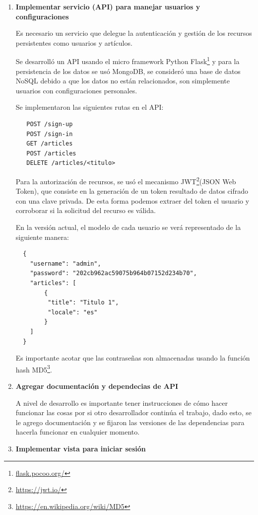 \begin{enumerate}
  \smallbreak
  \item\textbf{Implementar servicio (API) para manejar usuarios y configuraciones}
  \smallbreak
  
  Es necesario un servicio que delegue la autenticación y gestión de los recursos persistentes como usuarios y artículos.
  
  Se desarrolló un API usando el micro framework Python Flask\footnote{\url{flask.pocoo.org/}} y para la persistencia de los datos se usó MongoDB, se consideró una base de datos NoSQL debido a que los datos no están relacionados, son simplemente usuarios con configuraciones personales.
  
  Se implementaron las siguientes rutas en el API:
  \begin{verbatim}
   POST /sign-up
   POST /sign-in
   GET /articles
   POST /articles
   DELETE /articles/<titulo>
  \end{verbatim}
  
  Para la autorización de recursos, se usó el mecanismo JWT\footnote{\url{https://jwt.io/}}(JSON Web Token), que consiste en la generación de un token resultado de datos cifrado con una clave privada. De esta forma podemos extraer del token el usuario y corroborar si la solicitud del recurso es válida.
  
  
  En la versión actual, el modelo de cada usuario se verá representado de la siguiente manera:
  
  \begin{verbatim}
  {
    "username": "admin",
    "password": "202cb962ac59075b964b07152d234b70",
    "articles": [
        {
         "title": "Titulo 1",
         "locale": "es"
        }
    ]
  }
  \end{verbatim}
  
  Es importante acotar que las contraseñas son almacenadas usando la función hash MD5\footnote{\url{https://en.wikipedia.org/wiki/MD5}}.

  \smallbreak
  \item\textbf{Agregar documentación y dependecias de API}
  \smallbreak
  
  A nivel de desarrollo es importante tener instrucciones de cómo hacer funcionar las cosas por si otro desarrollador continúa el trabajo, dado esto, se le agrego documentación y se fijaron las versiones de las dependencias para hacerla funcionar en cualquier momento.
  
  \smallbreak
  \item\textbf{Implementar vista para iniciar sesión}
  \smallbreak
  

\end{enumerate}
